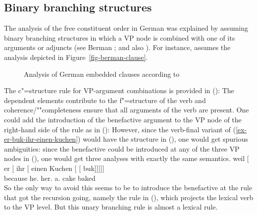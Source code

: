 \subsection{Binary branching structures}

The analysis of the free constituent order in German was explained by assuming binary branching
structures in which a VP node is combined with one of its arguments or adjuncts (see Berman
\citeyear[Section~2.1.3.1]{Berman96a-u}; \citeyear{Berman2003a} and also \citealp{Choi99a-u}).
For instance, \citet[]{Berman2003a} assumes the analysis depicted in
Figure~\vref{fig-berman-clause}.
\begin{figure}[t]
\caption{Analysis of German embedded clauses according to \citet[]{Berman2003a}}\label{fig-berman-clause}
\end{figure}
The c"=structure rule for VP-argument combinations is provided in ():
\ea
\label{lfg-vp-regel-two}
\z
The dependent elements contribute to the f"=structure of the verb and coherence/""completeness ensure that all
arguments of the verb are present. One could add the introduction of the benefactive argument to
the VP node of the right-hand side of the rule as in ():
\ea
\label{lfg-vp-regel-three}
\z
However, since the verb-final variant of
(\ref{ex-er-buk-ihr-einen-kuchen}) would have the structure in (), one would get spurious
ambiguities: since the benefactive could be introduced at any of the three VP nodes in (),
one would get three analyses with exactly the same semantics.
\ea
\label{ex-er-ihr-einen-kuchen-buk}
\gll weil    [ er [ ihr [ einen Kuchen [ [ buk]]]]]\\
     because {}        he.\nom{} {}        her.\dat{} {}        a.\acc{} cake       {}        {}       baked\\
\z
So the only way to avoid this seems to be to introduce the benefactive at the rule that got the recursion
going, namely the rule in (), which projects the lexical verb to the VP level.
\ea
\label{LFG-v-vp-two}
\z
But this unary branching rule is almost a lexical rule. 

